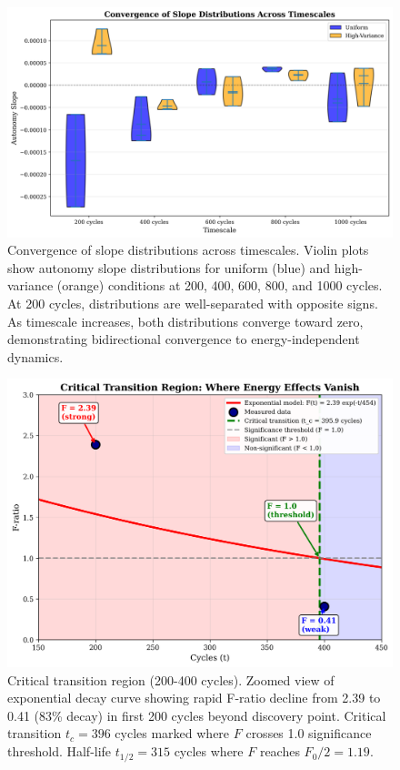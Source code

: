 \documentclass[11pt]{article}
\begin{document}
\begin{figure}[t]
\centering
\includegraphics[width=0.95\linewidth]{figure3_slope_distributions.png}
\caption{Convergence of slope distributions across timescales. Violin plots show autonomy slope distributions for uniform (blue) and high-variance (orange) conditions at 200, 400, 600, 800, and 1000 cycles. At 200 cycles, distributions are well-separated with opposite signs. As timescale increases, both distributions converge toward zero, demonstrating bidirectional convergence to energy-independent dynamics.}
\end{figure}

\begin{figure}[t]
\centering
\includegraphics[width=0.95\linewidth]{figure4_critical_transition.png}
\caption{Critical transition region (200-400 cycles). Zoomed view of exponential decay curve showing rapid F-ratio decline from 2.39 to 0.41 (83\% decay) in first 200 cycles beyond discovery point. Critical transition $t_c = 396$ cycles marked where $F$ crosses 1.0 significance threshold. Half-life $t_{1/2} = 315$ cycles where $F$ reaches $F_0/2 = 1.19$.}
\end{figure}
\end{document}

